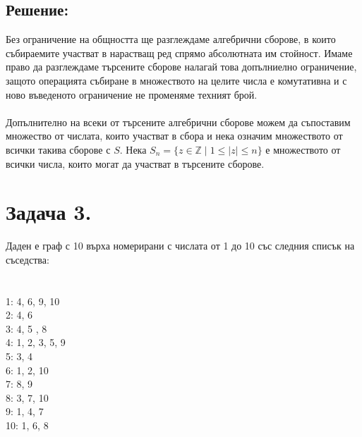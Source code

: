 \documentclass[14pt]{extarticle}
\newcommand{\Z}{\mathbb{Z}}
\begin{document}
\subsection*{Решение:}
Без ограничение на общността ще разглеждаме алгебрични сборове, в които събираемите участват в нарастващ ред спрямо абсолютната им стойност. Имаме право да разглеждаме търсените сборове налагай това допълниелно ограничение, защото операцията събиране в множеството на целите числа е комутативна и с ново въведеното ограничение не променяме техният брой. \\\\
Допълнително на всеки от търсените алгебрични сборове можем да съпоставим множество от числата, които участват в сбора и нека означим множеството от всички такива сборове с \(S\). Нека \(S_n = \{z \in \Z \; | \; 1 \leq |z| \leq n\} \) е множеството от всички числа, които могат да участват в търсените сборове.
\section*{Задача 3.}
Даден е граф с 10 върха номерирани с числата от 1 до 10 със следния списък на съседства:\\\\\\
1: 4, 6, 9, 10 \\
2: 4, 6 \\
3: 4, 5 , 8 \\
4: 1, 2, 3, 5, 9 \\
5: 3, 4 \\
6: 1, 2, 10 \\
7: 8, 9 \\
8: 3, 7, 10 \\
9: 1, 4, 7 \\
10: 1, 6, 8 \\\\
\end{document}

